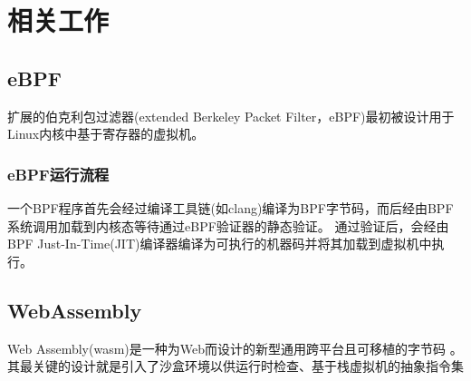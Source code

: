 
\section{相关工作}
\label{section:relatedWork}
\subsection{eBPF}
扩展的伯克利包过滤器(extended Berkeley Packet Filter，eBPF)最初被设计用于Linux内核中基于寄存器的虚拟机。
\subsubsection{eBPF运行流程}
一个BPF程序首先会经过编译工具链(如clang)编译为BPF字节码，而后经由BPF系统调用加载到内核态等待通过eBPF验证器的静态验证\cite{zhengBpftimeUserspaceEBPF2023}。\nolinebreak
通过验证后，会经由BPF Just-In-Time(JIT)编译器编译为可执行的机器码并将其加载到虚拟机中执行。
\subsection{WebAssembly}
Web Assembly(wasm)是一种为Web而设计的新型通用跨平台且可移植的字节码\nolinebreak
\cite{lehmannEverythingOldNew,lehmannWasabiFrameworkDynamically2019}。\nolinebreak
其最关键的设计就是引入了沙盒环境以供运行时检查、基于栈虚拟机的抽象指令集\nolinebreak
\cite{johnsonWaVeVerifiablySecure2023, WebAssemblySummaryOnSecurity, WasmbpfStreamliningEBPF2024, lehmannEverythingOldNew}\nolinebreak

